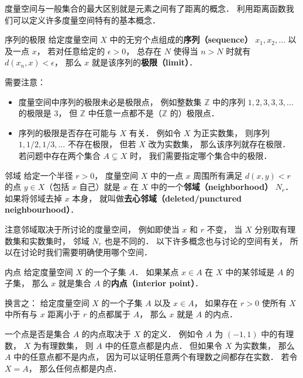 
度量空间与一般集合的最大区别就是元素之间有了距离的概念． 利用距离函数我们可以定义许多度量空间特有的基本概念．

\begin{definition}{序列的极限}\label{Metri2_def1}
给定度量空间 $X$ 中的无穷个点组成的\textbf{序列（sequence）} $x_1, x_2, \dots$ 以及一点 $x$， 若对任意给定的 $\epsilon > 0$， 总存在 $N$ 使得当 $n > N$ 时就有 $d(x_n, x) < \epsilon$， 那么 $x$ 就是该序列的\textbf{极限（limit）}．
\end{definition}
需要注意：
\begin{itemize}
\item 度量空间中序列的极限未必是极限点， 例如整数集 $\mathbb Z$ 中的序列 $1, 2, 3, 3, 3, \dots$ 的极限是 $3$， 但 $\mathbb Z$ 中任意一点都不是（$\mathbb Z$ 的）极限点．
\item 序列的极限是否存在可能与 $X$ 有关． 例如令 $X$ 为正实数集， 则序列 $1, 1/2, 1/3, \dots$ 不存在极限， 但若 $X$ 改为实数集， 那么该序列就存在极限． 若问题中存在两个集合 $A \subsetneq X$ 时， 我们需要指定哪个集合中的极限．
\end{itemize}

\begin{definition}{邻域}
给定一个半径 $r > 0$， 度量空间 $X$ 中的一点 $x$ 周围所有满足 $d(x, y) < r$ 的点 $y \in X$（包括 $x$ 自己）就是 $x$ 在 $X$ 中的一个\textbf{邻域（neighborhood）} $N_r$． 如果将邻域去掉 $x$ 本身， 就叫做\textbf{去心邻域（deleted/punctured neighbourhood）}．
\end{definition}
注意邻域取决于所讨论的度量空间， 例如即使当 $x$ 和 $r$ 不变， 当 $X$ 分别取有理数集和实数集时， 邻域 $N_r$ 也是不同的． 以下许多概念也与讨论的空间有关， 所以在讨论时我们需要明确使用哪个空间．

\begin{definition}{内点}\label{Metri2_def2}
给定度量空间 $X$ 的一个子集 $A$． 如果某点 $x\in A$ 在 $X$ 中的某邻域是 $A$ 的子集， 那么 $x$ 就是集合 $A$ 的\textbf{内点（interior point）}．

换言之： 给定度量空间 $X$ 的一个子集 $A$ 以及 $x \in A$， 如果存在 $r > 0$ 使所有 $X$ 中所有与 $x$ 距离小于 $r$ 的点都属于 $A$， 那么 $x$ 就是 $A$ 的内点．
\end{definition}

\begin{example}{}\label{Metri2_ex1}
一个点是否是集合 $A$ 的内点取决于 $X$ 的定义． 例如令 $A$ 为 $(-1, 1)$ 中的有理数， $X$ 为有理数集， 则 $A$ 中的任意点都是内点． 但如果令 $X$ 为实数集， 那么 $A$ 中的任意点都不是内点， 因为可以证明任意两个有理数之间都存在实数．%
若令 $X = A$， 那么任何点都是内点．
\end{example}

